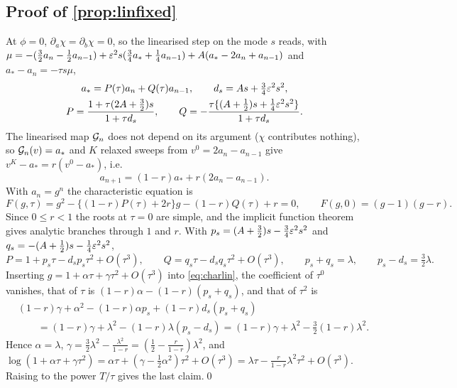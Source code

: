 \subsection{Proof of \cref{prop:linfixed}}\label{app:linfixed}
At $\phi=0$, $\partial_a\chi=\partial_b\chi=0$, so the linearised step on the mode $s$ reads, with $\mu=-(\frac32a_n-\frac12a_{n-1})+\varepsilon^2s(\frac34a_*+\frac14a_{n-1})+A(a_*-2a_n+a_{n-1})$ and $a_*-a_n=-\tau s\mu$,
\begin{equation}\label{eq:PQ}
\begin{gathered}a_*=P(\tau)a_n+Q(\tau)a_{n-1},\qquad d_s=As+\tfrac34\varepsilon^2s^2,\\ P=\frac{1+\tau(2A+\frac32)s}{1+\tau d_s},\qquad Q=-\frac{\tau\{(A+\frac12)s+\frac14\varepsilon^2s^2\}}{1+\tau d_s}.\end{gathered}
\end{equation}
The linearised map $\mathcal{G}_n$ does not depend on its argument ($\chi$ contributes nothing), so $\mathcal{G}_n(v)=a_*$ and $K$ relaxed sweeps from $v^0=2a_n-a_{n-1}$ give $v^K-a_*=r(v^0-a_*)$, i.e.
\[
a_{n+1}=(1-r)a_*+r(2a_n-a_{n-1}).
\]
With $a_n=g^n$ the characteristic equation is
\begin{equation}\label{eq:charlin}
F(g,\tau)=g^2-\{(1-r)P(\tau)+2r\}g-(1-r)Q(\tau)+r=0,\qquad F(g,0)=(g-1)(g-r).
\end{equation}
Since $0\le r<1$ the roots at $\tau=0$ are simple, and the implicit function theorem gives analytic branches through $1$ and $r$. With $p_s=(A+\frac32)s-\frac34\varepsilon^2s^2$ and $q_s=-(A+\frac12)s-\frac14\varepsilon^2s^2$,
\[
P=1+p_s\tau-d_sp_s\tau^2+O(\tau^3),\qquad Q=q_s\tau-d_sq_s\tau^2+O(\tau^3),\qquad p_s+q_s=\lambda,\qquad p_s-d_s=\tfrac32\lambda .
\]
Inserting $g=1+\alpha\tau+\gamma\tau^2+O(\tau^3)$ into \eqref{eq:charlin}, the coefficient of $\tau^0$ vanishes, that of $\tau$ is $(1-r)\alpha-(1-r)(p_s+q_s)$, and that of $\tau^2$ is
\begin{align*}
&(1-r)\gamma+\alpha^2-(1-r)\alpha p_s+(1-r)d_s(p_s+q_s)\\
&\qquad=(1-r)\gamma+\lambda^2-(1-r)\lambda(p_s-d_s)=(1-r)\gamma+\lambda^2-\tfrac32(1-r)\lambda^2 .
\end{align*}
Hence $\alpha=\lambda$, $\gamma=\frac32\lambda^2-\frac{\lambda^2}{1-r}=(\frac12-\frac r{1-r})\lambda^2$, and $\log(1+\alpha\tau+\gamma\tau^2)=\alpha\tau+(\gamma-\frac12\alpha^2)\tau^2+O(\tau^3)=\lambda\tau-\frac r{1-r}\lambda^2\tau^2+O(\tau^3)$. Raising to the power $T/\tau$ gives the last claim.\qed

